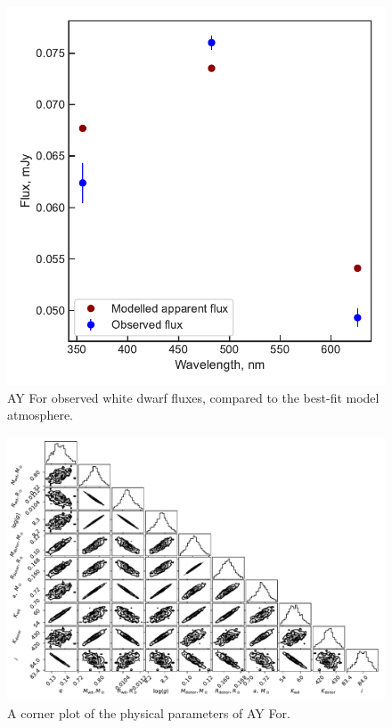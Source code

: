 \begin{figure}
    \centering
    \includegraphics[width=\textwidth]{figures/results/AYFor/fluxplot.pdf}
    \caption{AY For observed white dwarf fluxes, compared to the best-fit model atmosphere.}
    \label{fig:AYFor flux plot}
\end{figure}
\begin{figure}
    \includegraphics[height=\textwidth, angle=90]{figures/results/physicalparams_corners/AYFor_physcorner.pdf}
    \caption{A corner plot of the physical parameters of AY For.}
\end{figure}
\clearpage




